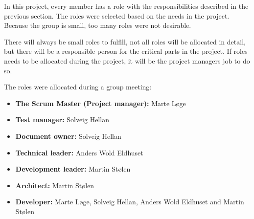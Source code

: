 In this project, every member has a role with the responsibilities described in the previous section.
The roles were selected based on the needs in the project. Because the group is small, too many roles were not desirable.

There will always be small roles to fulfill, not all roles will be allocated in detail, but there will be a responsible person for the critical parts in the project. If roles needs to be allocated during the project, it will be the project managers job to do so.

The roles were allocated during a group meeting:
\begin{itemize}
  \item {\bf The Scrum Master (Project manager):} Marte Løge
  \item {\bf Test manager:} Solveig Hellan
  \item {\bf Document owner:} Solveig Hellan
  \item {\bf Technical leader:} Anders Wold Eldhuset
  \item {\bf Development leader:} Martin Stølen
  \item {\bf Architect:} Martin Stølen
  \item {\bf Developer:} Marte Løge, Solveig Hellan, Anders Wold Eldhuset and Martin Stølen
\end{itemize}





